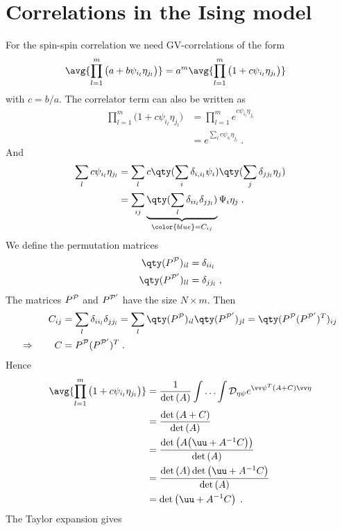 \section{Correlations in the Ising model}
%
For the spin-spin correlation we need
GV-correlations of the form
%
\begin{align*}
\avg{\prod_{l=1}^{m} \big(a + b\psi_{i_{l}} \eta_{j_{l}}\big)}
&= a^{m}\avg{\prod_{l=1}^{m} \big(1 + c\psi_{i_{l}} \eta_{j_{l}}\big)}
\end{align*}
%
with $c =b/a$. 
The correlator term can also be written as
%
%
\begin{align*}
\prod_{l=1}^{m} \big(1 + c\psi_{i_{l}} \eta_{j_{l}}\big) 
&=\prod_{l=1}^{m} e^{c\psi_{i_{l}} \eta_{j_{l}}} \\
&= e^{\sum_{l}c\psi_{i_{l}} \eta_{j_{l}}} \;.
\end{align*}
%
And
%
\begin{align*}
\sum_{l}c\psi_{i_{l}} \eta_{j_{l}}
&=
\sum_{l}c \qty(\sum_{i} \delta_{i,i_{l}} \psi_{i} )
\qty(\sum_{j} \delta_{j j_{l}} \eta_{j})\\
&= \sum_{ij} \underbrace{
\qty(\sum_{l} \delta_{i i_{l}} \delta_{j j_{l}})
}_{\color{blue} = C_{ij}} \Psi_{i}
\eta_{j}\;.
\end{align*}
%
We define the permutation matrices
%
\begin{align*}
\qty(P^{\cal P}) _{il} &= \delta_{i i_{l}}\\
\qty(P^{\cal P'} )_{ll} &= \delta_{j j_{l}}\;,
\end{align*}
%
The matrices $P^{{\cal P}}$ and $P^{{\cal P}'}$ have the size $N\times m$.
Then
%
\begin{align*}
C_{ij} &= \sum_{l} \delta_{i i_{l}} \delta_{j j_{l}} =\sum_{l}
\qty(P^{\cal P}) _{il} \qty(P^{\cal P'} )_{jl}
= \qty(P^{\cal P}  (P^{{\cal P}'})^{T} )_{ij}\\
\Rightarrow\qquad C &= P^{\cal P}  (P^{{\cal P}'})^{T} \;.
\end{align*}
%
Hence
%
\begin{align}\label{eq:}
\avg{\prod_{l=1}^{m} \big(1 + c\psi_{i_{l}} \eta_{j_{l}}\big)}
&=\frac{1}{\Det{A}} \Int \Dep 
e^{\vv \psi^{T} (A + C)\vv \eta}\\
&=\frac{\Det{A+C}}{\Det{A}}\\
&=\frac{\Det{A \big(\uu +A^{-1} C\big)}}{\Det{A}}\\
&=\frac{\Det{A}\Det{\uu +A^{-1} C}}{\Det{A}}\\
&=\Det{\uu +A^{-1} C}\;.
\end{align}
%
The Taylor expansion gives 
